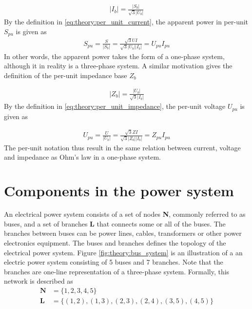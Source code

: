 \documentclass[class=book, crop=false]{standalone}
\begin{document}
\begin{equation}
   \begin{aligned}\label{eq:theory:per_unit_current}
|I_{b}| = \frac{|S_{b}|}{\sqrt{3}|U_{b}|}
\end{aligned} 
\end{equation}
By the definition in \eqref{eq:theory:per_unit_current}, the apparent power in per-unit $S_{pu}$ is given as 
\begin{equation}
   \begin{aligned}\label{eq:theory:per_unit_power}
S_{pu} = \frac{S}{|S_{b}|}
        = \frac{\sqrt{3}UI}{\sqrt{3}|U_{b}||I_{b}|}
        = U_{pu}I_{pu}
\end{aligned} 
\end{equation}
In other words, the apparent power takes the form of a one-phase system, although it in reality is a three-phase system. A similar motivation gives the definition of the per-unit impedance base $Z_{b}$

\begin{equation}
   \begin{aligned}\label{eq:theory:per_unit_impedance}
|Z_{b}| = \frac{|U_{b}|}{\sqrt{3}|I_{b}|}
\end{aligned} 
\end{equation}
By the definition in \eqref{eq:theory:per_unit_impedance}, the per-unit voltage $U_{pu}$ is given as 

\begin{equation}
   \begin{aligned}\label{eq:theory:per_unit_impedance_ohm}
U_{pu} = \frac{U}{|U_{b}|}
        = \frac{\sqrt{3}ZI}{\sqrt{3}|Z_{b}||I_{b}|}
        = Z_{pu}I_{pu}
\end{aligned} 
\end{equation}
The per-unit notation thus result in the same relation between current, voltage and impedance as Ohm's law in a one-phase system. 

\section{Components in the power system}
An electrical power system consists of a set of nodes \textbf{N}, commonly referred to as buses, and a set of branches \textbf{L} that connects some or all of the buses. The branches between buses can be power lines, cables, transformers or other power electronics equipment. The buses and branches defines the topology of the electrical power system. Figure \ref{fig:theory:bus_system} is an illustration of a an electric power system consisting of 5 buses and 7 branches. Note that the branches are one-line representation of a three-phase system. Formally, this network is described as 
\begin{equation}
   \begin{aligned}\label{eq:theory:network_set}
\textbf{N} &= \{1,2,3,4,5\}\\
\textbf{L} &= \{(1,2),(1,3),(2,3),(2,4),(3,5),(4,5)\}
\end{aligned} 
\end{equation}
\end{document}
